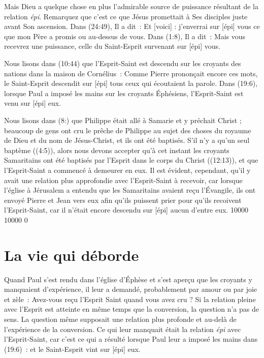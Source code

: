 Mais Dieu a quelque chose en plus \ocadr l'admirable source de puissance
 résultant de la relation \emph{épi}.
 Remarquez que c'est ce que Jésus promettait à Ses disciples juste avant
 Son ascension. Dans (24:49), Il a dit~:
 \og Et [voici] : j'enverrai sur [épi] vous ce que mon Père a promis \fg{} ou
 \og au-dessus de vous. \fg{}
 Dans (1:8), Il a dit~:
 \og Mais vous recevrez une puissance, celle du Saint-Esprit survenant
 sur [épi] vous. \fg{}

\begin{specialpar}{}
Nous lisons dans (10:44) que l'Esprit-Saint est descendu
 \og sur \fg{} les croyants des nations dans la maison de Cornélius~:
 \og Com\-me Pierre prononçait encore ces mots, le Saint-Esprit descendit
 sur [épi] tous ceux qui écoutaient la parole. \fg{}
 Dans (19:6), lorsque Paul a imposé les mains sur les
 croyants Éphésiens, l'Esprit-Saint est venu sur [épi] eux.
\end{specialpar}

Nous lisons dans (8:) que Philippe était allé à Samarie
 et y préchait Christ ; beaucoup de gens ont cru le prêche de Philippe
 au sujet des choses du royaume de Dieu et du nom de Jésus-Christ,
 et ils ont été baptisés.
 S'il n'y a qu'un seul baptème ((4:5)),
 alors nous devons accepter qu'à cet instant les croyants Samaritains
 ont été baptisés par l'Esprit dans le corps du Christ
 ((12:13)), et que l'Esprit-Saint a commencé à demeurer
 en eux. Il est évident, cependant, qu'il y avait une relation plus approfondie
 avec l'Esprit-Saint à recevoir, car lorsque l'église à Jérusalem a entendu
 que les Samaritains avaient reçu l'Évangile, ils ont envoyé Pierre et Jean
 vers eux afin qu'ils puissent prier pour qu'ils recoivent l'Esprit-Saint,
 car il n'était encore descendu sur [épi] aucun d'entre eux.
 \begingroup{} 10000 10000 0
 \par\endgroup

\section{La vie qui d\'eborde}

Quand Paul s'est rendu dans l'église d'Éphèse et s'est aperçu
 que les croyants y manquaient d'expérience, il leur a demandé,
 probablement par amour ou par joie et zèle~:
 \og Avez-vous reçu l'Esprit Saint quand vous avez cru ? \fg{}
 Si la relation pleine avec l'Esprit est atteinte en même temps
 que la conversion, la question n'a pas de sens.
 La question même supposait une relation plus profonde et au-delà
 de l'expérience de la conversion. Ce qui leur manquait était la relation
 \emph{épi} avec l'Es\-prit-Saint, car c'est ce qui a résulté lorsque
 Paul leur a imposé les mains dans (19:6)~:
 \og et le Saint-Esprit vint sur [épi] eux. \fg{}

